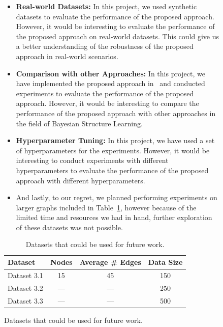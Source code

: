 \documentclass{lxaiproposal}
\begin{document}
\begin{figure}[h]
    \begin{itemize}
        \item \textbf{Real-world Datasets:} In this project, we used synthetic datasets to evaluate the performance of
        the proposed approach. However, it would be interesting to evaluate the performance of the proposed approach
        on real-world datasets. This could give us a better understanding of the robustness of the proposed approach
        in real-world scenarios.
        \item \textbf{Comparison with other Approaches:} In this project, we have implemented the proposed approach
        in~\cite{deleu2022daggflownet} and conducted experiments to evaluate the performance of the proposed approach.
        However, it would be interesting to compare the performance of the proposed approach with other approaches in
        the field of Bayesian Structure Learning.
        \item \textbf{Hyperparameter Tuning:} In this project, we have used a set of hyperparameters for the
        experiments. However, it would be interesting to conduct experiments with different hyperparameters to
        evaluate the performance of the proposed approach with different hyperparameters.
        \item And lastly, to our regret, we planned performing experiments on larger graphs included in
        Table~\ref{tab:future_dataset}, however because of the limited time and resources we had in hand,
        further exploration of these datasets was not possible.
    \end{itemize}

    \begin{table}[h]
        \centering
        \begin{tabular}{|l|c|c|c|}
            \hline
            \textbf{Dataset} & \textbf{Nodes} & \textbf{Average # Edges} & \textbf{Data Size} \\
            \hline
            Dataset 3.1      & 15             & 45                       & 150                \\
            Dataset 3.2      & ---            & ---                      & 250                \\
            Dataset 3.3      & ---            & ---                      & 500                \\
            \hline
        \end{tabular}
        \caption{Datasets that could be used for future work.}
        \label{tab:future_dataset}
    \end{table}



\end{figure}
\end{document}
